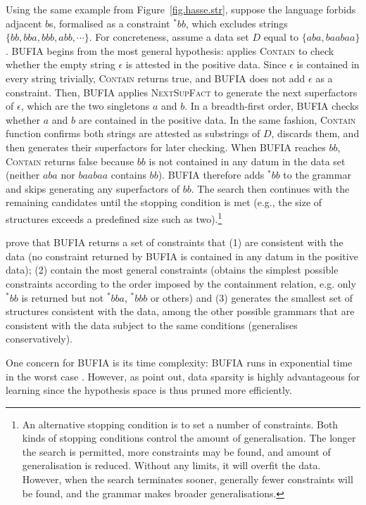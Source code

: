 \documentclass{CUP-JNL-PHO}%
\theoremstyle{definition}
\numberwithin{equation}{section}
\theoremstyle{definition}
\begin{document}
Using the same example from Figure~\ref{fig.hasse.str}, suppose
the language forbids adjacent \(b\)s, formalised as a constraint
\(^*bb\), which excludes strings \(\{bb, bba, bbb, abb,
\cdots\}\). For concreteness, assume a data set \(D\) equal to
\(\{aba, baabaa\}\).  BUFIA begins from the most general hypothesis:
applies \textsc{Contain} to check whether the empty string $\epsilon$
is attested in the positive data.  Since $\epsilon$ is contained in
every string trivially, \textsc{Contain} returns true, and BUFIA does
not add $\epsilon$ as a constraint. Then, BUFIA applies
\textsc{NextSupFact} to generate the next superfactors of $\epsilon$,
which are the two singletons \(a\) and \(b\). In a breadth-first
order, BUFIA checks whether \(a\) and \(b\) are contained in the
positive data.  In the same fashion, \textsc{Contain} function
confirms both strings are attested as substrings of \(D\), discards
them, and then generates their superfactors for later checking. When
BUFIA reaches \(bb\), \textsc{Contain} returns false because
\(bb\) is not contained in any datum in the data set (neither \(aba\) nor 
\(baabaa\) contains \(bb\)). BUFIA therefore adds
\(^*bb\) to the grammar and skips generating any superfactors of
\(bb\). The search then continues with the remaining candidates until
the stopping condition is met (e.g., the size of structures exceeds a
predefined size such as two).\footnote{An alternative stopping
  condition is to set a number of constraints. Both kinds of stopping
  conditions control the amount of generalisation. The longer the
  search is permitted, more constraints may be found, and amount of
  generalisation is reduced. Without any limits, it will overfit the
  data. However, when the search terminates sooner, generally fewer
  constraints will be found, and the grammar makes broader
  generalisations.}

\citet{chandleeBufia2019} prove that BUFIA returns a set of
constraints that (1) are consistent with the data (no constraint
returned by BUFIA is contained in any datum in the positive data); (2)
contain the most general constraints (obtains the simplest possible
constraints according to the order imposed by the containment
relation, e.g.  only \(^*bb\) is returned but not \(^*bba\), \(^*bbb\)
or others) and (3) generates the smallest set of structures consistent
with the data, among the other possible grammars that are
consistent with the data subject to the same conditions (generalises
conservatively).

One concern for BUFIA is its time complexity: BUFIA runs in exponential time in the worst 
case \citep{chandleeBufia2019}. However, as \citet{Swanson+2025} 
point out, data sparsity is highly advantageous for learning since 
the hypothesis space is thus pruned more efficiently.
\end{document}

